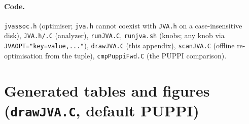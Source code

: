 \documentclass[11pt,a4paper]{article}
\begin{document}
\paragraph{Code.} \texttt{jvassoc.h} (optimiser; \texttt{jva.h} cannot coexist
with \texttt{JVA.h} on a case-insensitive disk), \texttt{JVA.h/.C} (analyzer),
\texttt{runJVA.C}, \texttt{runjva.sh} (knobs; any knob via
\texttt{JVAOPT="key=value,..."}), \texttt{drawJVA.C} (this appendix),
\texttt{scanJVA.C} (offline re-optimisation from the tuple),
\texttt{cmpPuppiFwd.C} (the PUPPI comparison).

\clearpage
\appendix
\section{Generated tables and figures (\texttt{drawJVA.C}, default PUPPI)}

\clearpage

\end{document}
